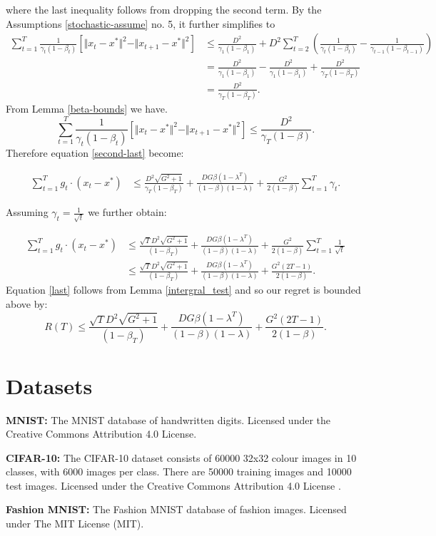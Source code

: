 \documentclass{article}
\begin{document}
where the last inequality follows from dropping the second term. By the Assumptions \ref{stochastic-assume} no. 5, it further simplifies to
\begin{align*}
\sum_{t=1}^T \frac{1}{\gamma_t (1-\beta_t)}
\left[\Vert x_t-x^*\Vert^2 - \Vert x_{t+1} -x^*\Vert^2\right] 
&\le
\frac{D^2}{\gamma_1(1-\beta_1)}  + 
D^2\sum_{t=2}^T \left(\frac{1}{\gamma_t (1-\beta_t) } - \frac{1}{\gamma_{t-1} (1-\beta_{t-1})} \right)\\
&=
\frac{D^2}{\gamma_1(1-\beta_1)}  - \frac{D^2}{\gamma_1(1-\beta_1)} + \frac{D^2}{\gamma_T(1-\beta_T)}\\
&=\frac{D^2}{\gamma_T(1-\beta_T)}.
\end{align*}
From Lemma \ref{beta-bounds} we have.
$$\sum_{t=1}^T \frac{1}{\gamma_t (1-\beta_t)}
\left[\Vert x_t-x^*\Vert^2 - \Vert x_{t+1} -x^*\Vert^2\right] 
\le \frac{D^2}{\gamma_T(1-\beta)}.$$
Therefore equation \ref{second-last} become:

\begin{align}
\sum_{t=1}^T g_t\cdot (x_t - x^*)
    &\le
    \frac{D^2\sqrt{G^2+1}}{\gamma_T(1-\beta_T)} 
    +
    \frac{DG\beta(1-\lambda^T)}{(1-\beta)(1-\lambda)}
    +  \frac{ G^2}{2(1-\beta) } \sum_{t=1}^T \gamma_t.
\end{align}

Assuming $\gamma_t=\frac{1}{\sqrt{t}}$ we further obtain:

\begin{align}
\sum_{t=1}^T g_t\cdot (x_t - x^*)
    &\le
    \frac{\sqrt{T}D^2\sqrt{G^2+1}}{(1-\beta_T)} 
    +
    \frac{DG\beta(1-\lambda^T)}{(1-\beta)(1-\lambda)}
    +  \frac{ G^2}{2(1-\beta) } \sum_{t=1}^T \frac{1}{\sqrt{t}}\\
    &\le
    \frac{\sqrt{T}D^2\sqrt{G^2+1}}{(1-\beta_T)} 
    +
    \frac{DG\beta(1-\lambda^T)}{(1-\beta)(1-\lambda)}
    +  \frac{ G^2 (2T-1)}{2(1-\beta) }. \label{last}
\end{align}
Equation \ref{last} follows from Lemma \ref{intergral_test} and so our regret is bounded above by:
$$R(T)\le    \frac{\sqrt{T}D^2\sqrt{G^2+1}}{(1-\beta_T)} 
    +
    \frac{DG\beta(1-\lambda^T)}{(1-\beta)(1-\lambda)}
    +  \frac{ G^2 (2T-1)}{2(1-\beta) }.$$

\section{Datasets \label{datasets}}

\textbf{MNIST:} The MNIST database of handwritten digits. Licensed under the Creative Commons Attribution 4.0 License\citep{lecun2010mnist}.

\textbf{CIFAR-10:} The CIFAR-10 dataset consists of 60000 32x32 colour images in 10 classes, with 6000 images per class. There are 50000 training images and 10000 test images. Licensed under the Creative Commons Attribution 4.0 License \citep{Krizhevsky09learningmultiple}.

\textbf{Fashion MNIST:} The Fashion MNIST database of  fashion images. Licensed under The MIT License (MIT).\cite{xiao2017fashion}
\end{document}
